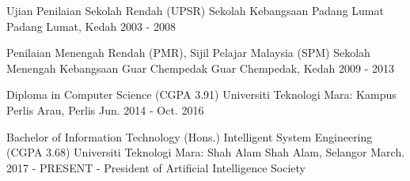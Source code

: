

\begin{cventries}


\cventry
  {Ujian Penilaian Sekolah Rendah (UPSR)}
  {Sekolah Kebangsaan Padang Lumat}
  {Padang Lumat, Kedah}
  {2003 - 2008}
  {}

\cventry
  {Penilaian Menengah Rendah (PMR), Sijil Pelajar Malaysia (SPM)}
  {Sekolah Menengah Kebangsaan Guar Chempedak}
  {Guar Chempedak, Kedah}
  {2009 - 2013}
  {}

\cventry
  {Diploma in Computer Science (CGPA 3.91)}
  {Universiti Teknologi Mara: Kampus Perlis}
  {Arau, Perlis}
  {Jun. 2014 - Oct. 2016}
  {}

  \cventry
  {Bachelor of Information Technology (Hons.) Intelligent System Engineering (CGPA 3.68)}
  {Universiti Teknologi Mara: Shah Alam}
  {Shah Alam, Selangor}
  {March. 2017 - PRESENT}
  {- President of Artificial Intelligence Society}

\end{cventries}
